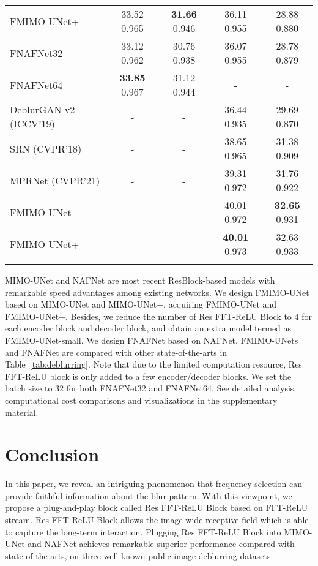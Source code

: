 \documentclass[letterpaper]{article} \usepackage{aaai23}  \usepackage{times}  \usepackage{helvet}  \usepackage{courier}  \usepackage[hyphens]{url}  \usepackage{graphicx} \usepackage{enumitem}
\begin{document}
\begin{table}[!t]
\begin{center}
{\begin{tabular}{l c | c | c | c }
FMIMO-UNet+ & 33.52 \colorbox{color4}{0.965} & \textbf{31.66} \colorbox{color4}{0.946} & 36.11 \colorbox{color4}{0.955} & 28.88 \colorbox{color4}{0.880}\\
FNAFNet32 & 33.12 \colorbox{color4}{0.962} & 30.76 \colorbox{color4}{0.938} & 36.07 \colorbox{color4}{0.955} & 28.78 \colorbox{color4}{0.879}\\
FNAFNet64 & \textbf{33.85} \colorbox{color4}{0.967} & 31.12 \colorbox{color4}{0.944} & - & - \\
\arrayrulecolor{black}\bottomrule[0.1em]
\bottomrule[0.1em]
\small{DeblurGAN-v2 {\color{red}} (ICCV'19)} & - & - & 36.44 \colorbox{color4}{0.935} & 29.69 \colorbox{color4}{0.870}\\
SRN {\color{red}} (CVPR'18) & - & - & 38.65 \colorbox{color4}{0.965} & 31.38 \colorbox{color4}{0.909}\\
MPRNet {\color{red}} (CVPR'21) & - & - & {39.31} \colorbox{color4}{0.972} & 31.76 \colorbox{color4}{0.922}\\
\arrayrulecolor{black!30}\midrule
FMIMO-UNet {\color{red}} & - & - & 40.01 \colorbox{color4}{0.972} & \textbf{32.65} \colorbox{color4}{0.931}\\
FMIMO-UNet+ {\color{red}} & - & - & \textbf{40.01} \colorbox{color4}{0.973} & 32.63 \colorbox{color4}{0.933} \\
\arrayrulecolor{black}\bottomrule[0.15em]
\end{tabular}}
\end{center}
\end{table}

MIMO-UNet and NAFNet are most recent ResBlock-based models with remarkable speed advantages among existing networks. We design FMIMO-UNet based on MIMO-UNet and MIMO-UNet+, acquiring FMIMO-UNet and FMIMO-UNet+. Besides, we reduce the number of Res FFT-ReLU Block to 4 for each encoder block and decoder block, and obtain an extra model termed as FMIMO-UNet-small. We design FNAFNet based on NAFNet. FMIMO-UNets and FNAFNet are compared with other state-of-the-arts in Table~\ref{tab:deblurring}. Note that due to the limited computation resource, Res FFT-ReLU block is only added to a few encoder/decoder blocks. We set the batch size to 32 for both FNAFNet32 and FNAFNet64. See detailed analysis, computational cost comparisons and visualizations in the supplementary material.

\section{Conclusion}
In this paper, we reveal an intriguing phenomenon that frequency selection can provide faithful information about the blur pattern. With this viewpoint, we propose a plug-and-play block called Res FFT-ReLU Block based on FFT-ReLU stream. Res FFT-ReLU Block allows the image-wide receptive field which is able to capture the long-term interaction. Plugging Res FFT-ReLU Block into MIMO-UNet and NAFNet achieves remarkable superior performance compared with state-of-the-arts, on three well-known public image deblurring datasets.
\end{document}
